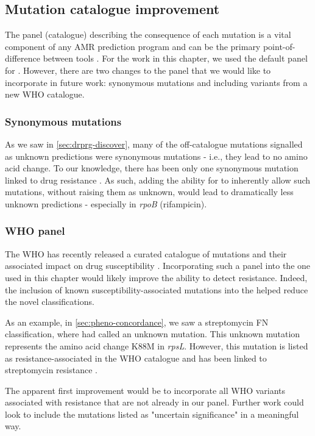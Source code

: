 \subsection{Mutation catalogue improvement}

The panel (catalogue) describing the consequence of each mutation is a vital component of any AMR prediction program and can be the primary point-of-difference between tools \cite{hunt2019}. For the work in this chapter, we used the default \mykrobe{} panel for \drprg{}. However, there are two changes to the \drprg{} panel that we would like to incorporate in future work: synonymous mutations and including variants from a new WHO catalogue.

\subsubsection{Synonymous mutations}

As we saw in \autoref{sec:drprg-discover}, many of the off-catalogue mutations signalled as unknown predictions were synonymous mutations - i.e., they lead to no amino acid change. To our knowledge, there has been only one synonymous mutation linked to \mtb{} drug resistance \cite{Ando2014}. As such, adding the ability for \drprg{} to inherently allow such mutations, without raising them as unknown, would lead to dramatically less unknown predictions - especially in \textit{rpoB} (rifampicin).

\subsubsection{WHO panel}

The WHO has recently released a curated catalogue of \mtb{} mutations and their associated impact on drug susceptibility \cite{whopanel2021}. Incorporating such a panel into the one used in this chapter would likely improve the ability to detect resistance. Indeed, the inclusion of known susceptibility-associated mutations into the \drprg{} helped reduce the novel classifications.

As an example, in \autoref{sec:pheno-concordance}, we saw a streptomycin FN classification, where \drprg{} had called an unknown mutation. This unknown mutation represents the amino acid change K88M in \textit{rpsL}. However, this mutation is listed as resistance-associated in the WHO catalogue and has been linked to streptomycin resistance \cite{Smittipat2016}.

The apparent first improvement would be to incorporate all WHO variants associated with resistance that are not already in our panel. Further work could look to include the mutations listed as "uncertain significance" in a meaningful way.

